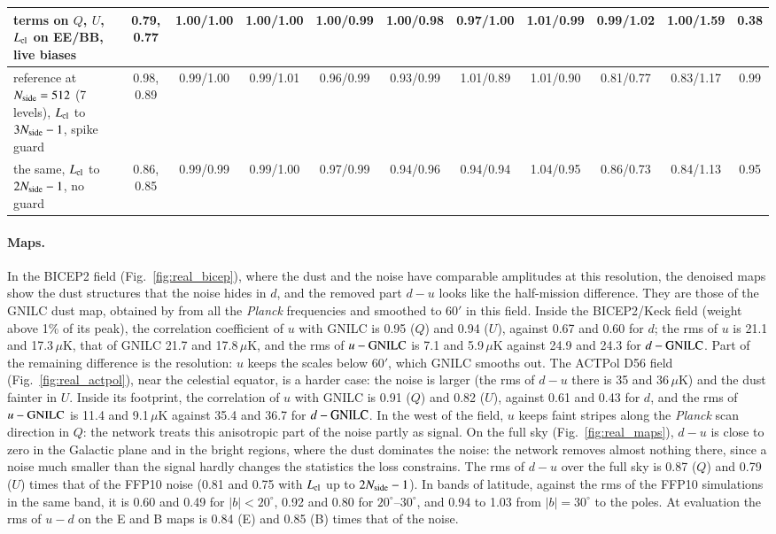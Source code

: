 \documentclass{aa}
\newcommand{\nside}{N_{\rm side}}
\begin{document}
\begin{table}
\begin{tabular}{p{4.2cm}cccccccccc}
    terms on $Q$, $U$, $L_{\rm cl}$ on EE/BB, live biases & 0.79, 0.77 & 1.00/1.00 & 1.00/1.00 & 1.00/0.99 & 1.00/0.98 & 0.97/1.00 & 1.01/0.99 & 0.99/1.02 & 1.00/1.59 & 0.38 \\
    \hline
    reference at $\nside=512$ (7 levels), $L_{\rm cl}$ to $3\nside-1$, spike guard & 0.98, 0.89 & 0.99/1.00 & 0.99/1.01 & 0.96/0.99 & 0.93/0.99 & 1.01/0.89 & 1.01/0.90 & 0.81/0.77 & 0.83/1.17 & 0.99 \\
    the same, $L_{\rm cl}$ to $2\nside-1$, no guard & 0.86, 0.85 & 0.99/0.99 & 0.99/1.00 & 0.97/0.99 & 0.94/0.96 & 0.94/0.94 & 1.04/0.95 & 0.86/0.73 & 0.84/1.13 & 0.95 \\
    \hline
  \end{tabular}
\end{table}

\paragraph{Maps.} In the BICEP2 field (Fig.~\ref{fig:real_bicep}), where the dust and the noise have comparable amplitudes at this resolution, the denoised maps show the dust structures that the noise hides in $d$, and the removed part $d-u$ looks like the half-mission difference. They are those of the GNILC dust map, obtained by \citet{planck2020gnilc} from all the \textit{Planck} frequencies and smoothed to 60$'$ in this field. Inside the BICEP2/Keck field (weight above 1\% of its peak), the correlation coefficient of $u$ with GNILC is 0.95 ($Q$) and 0.94 ($U$), against 0.67 and 0.60 for $d$; the rms of $u$ is 21.1 and 17.3\,$\mu$K, that of GNILC 21.7 and 17.8\,$\mu$K, and the rms of $u-{\rm GNILC}$ is 7.1 and 5.9\,$\mu$K against 24.9 and 24.3 for $d-{\rm GNILC}$. Part of the remaining difference is the resolution: $u$ keeps the scales below 60$'$, which GNILC smooths out. The ACTPol D56 field (Fig.~\ref{fig:real_actpol}), near the celestial equator, is a harder case: the noise is larger (the rms of $d-u$ there is 35 and 36\,$\mu$K) and the dust fainter in $U$. Inside its footprint, the correlation of $u$ with GNILC is 0.91 ($Q$) and 0.82 ($U$), against 0.61 and 0.43 for $d$, and the rms of $u-{\rm GNILC}$ is 11.4 and 9.1\,$\mu$K against 35.4 and 36.7 for $d-{\rm GNILC}$. In the west of the field, $u$ keeps faint stripes along the \textit{Planck} scan direction in $Q$: the network treats this anisotropic part of the noise partly as signal. On the full sky (Fig.~\ref{fig:real_maps}), $d-u$ is close to zero in the Galactic plane and in the bright regions, where the dust dominates the noise: the network removes almost nothing there, since a noise much smaller than the signal hardly changes the statistics the loss constrains. The rms of $d-u$ over the full sky is 0.87 ($Q$) and 0.79 ($U$) times that of the FFP10 noise (0.81 and 0.75 with $L_{\rm cl}$ up to $2\nside-1$). In bands of latitude, against the rms of the FFP10 simulations in the same band, it is 0.60 and 0.49 for $|b|<20^\circ$, 0.92 and 0.80 for $20^\circ$--$30^\circ$, and 0.94 to 1.03 from $|b|=30^\circ$ to the poles. At evaluation the rms of $u-d$ on the E and B maps is 0.84 (E) and 0.85 (B) times that of the noise.
\end{document}
